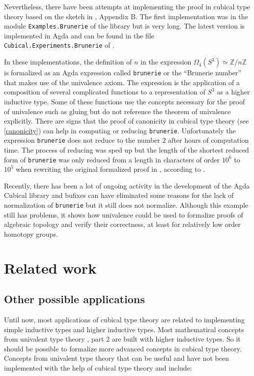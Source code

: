 \documentclass[12pt,a4paper,twoside,xetex]{book} %
\begin{document}
Nevertheless, there have been attempts at implementing the proof in cubical type 
theory based on the sketch in \cite{Brunerie2016}, Appendix B. The first 
implementation was in the module \texttt{Examples.Brunerie} of the library 
\cite{Moertberg2015} but is very long. The latest version is implemented in Agda 
and can be found in the file  \texttt{Cubical.Experiments.Brunerie} of 
\cite{Moertberg2018}. 

In these implementations, the definition of  $n$ in the expression 
$\Omega_4(S^3) \simeq \mathbb{Z}/n\mathbb{Z}$ is formalized as an Agda 
expression called \texttt{brunerie} or the ``Brunerie number'' that makes use 
of the univalence axiom. The expression is the application of a composition of 
several complicated functions to a representation of $S^3$ as a higher 
inductive type. Some of these functions use the concepts necessary for the proof 
of univalence such as gluing but do not reference the theorem of 
univalence explicitly. There are signs that the proof of canonicity in 
cubical type theory (see \cref{canonicity}) can help in computing 
or reducing \texttt{brunerie}. Unfortunately the expression 
\texttt{brunerie} does not reduce to the number $2$ after hours of 
computation time. The process of reducing was sped up but the length of the
shortest reduced form of  \texttt{brunerie} was  only 
reduced from a length in characters of order $10^6$ to $10^5$ when rewriting 
the original formalized proof \cite{Moertberg2015} in \cite{Moertberg2018},  
according to \cite{Brunerie2018}.

Recently, there has been a lot of ongoing activity in the development of the 
Agda Cubical library and bufixes can have eliminated some reasons for the lack 
of normalization of \texttt{brunerie} but it still does not normalize. Although this example still has problems, 
it shows how univalence could be used to formalize proofs of algebraic topology 
and verify their correctness, at least for relatively low order homotopy groups.

\chapter{Related work}

\section{Other possible applications}\label{futapp}

Until now, most applications of cubical type theory are related to implementing 
simple inductive types and higher inductive types. Most mathematical concepts 
from univalent type theory \cite{Voevodsky2013}, part 2 are built with higher 
inductive types. So it should be possible to formalize more advanced concepts in 
cubical type theory. Concepts from univalent type theory that can be useful and 
have not been implemented with the help of cubical type theory and 
\cite{Moertberg2018} include:
\end{document}
